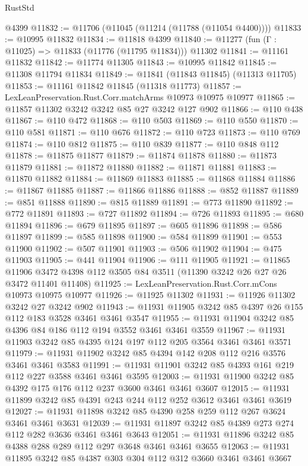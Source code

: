 \begin{lexlean}{RustStd}
\begin{coremodule}
    @4399
@11832 := @11706 (@11045 (@11214 (@11788 (@11054 @4400))))
@11833 := @10995 @11832
@11834 := @11818 @4399
@11840 := @11277 (fun (Γ : @11025) => @11833 (@11776 (@11795 @11834))) @11302
@11841 := @11161 @11832
@11842 := @11774 @11305
@11843 := @10995 @11842
@11845 := @11308 @11794 @11834
@11849 := @11841 (@11843 @11845) (@11313 @11705)
@11853 := @11161 @11842 @11845 (@11318 @11773)
@11857 := LexLeanPreservation.Rust.Corr.matchArms @10973 @10975 @10977
@11865 := @11857 @11302 @3242 @3242 @85 @27 @3242 @127 @902
@11866 := @110 @438
@11867 := @110 @472
@11868 := @110 @503
@11869 := @110 @550
@11870 := @110 @581
@11871 := @110 @676
@11872 := @110 @723
@11873 := @110 @769
@11874 := @110 @812
@11875 := @110 @839
@11877 := @110 @848 @112
@11878 := @11875 @11877
@11879 := @11874 @11878
@11880 := @11873 @11879
@11881 := @11872 @11880
@11882 := @11871 @11881
@11883 := @11870 @11882
@11884 := @11869 @11883
@11885 := @11868 @11884
@11886 := @11867 @11885
@11887 := @11866 @11886
@11888 := @852 @11887
@11889 := @851 @11888
@11890 := @815 @11889
@11891 := @773 @11890
@11892 := @772 @11891
@11893 := @727 @11892
@11894 := @726 @11893
@11895 := @680 @11894
@11896 := @679 @11895
@11897 := @605 @11896
@11898 := @586 @11897
@11899 := @585 @11898
@11900 := @584 @11899
@11901 := @553 @11900
@11902 := @507 @11901
@11903 := @506 @11902
@11904 := @475 @11903
@11905 := @441 @11904
@11906 := @111 @11905
@11921 := @11865
    @11906
    @3472
    @4398
    @112
    @3505
    @84
    @3511
    (@11390 @3242 @26 @27 @26 @3472 @11401 @11408)
@11925 := LexLeanPreservation.Rust.Corr.mCons @10973 @10975 @10977
@11926 := @11925 @11302
@11931 := @11926 @11302 @3242 @27 @3242 @902
@11943 := @11931 @11905 @3242 @85 @4397 @26 @155 @112 @183 @3528 @3461 @3461 @3547
@11955 := @11931 @11904 @3242 @85 @4396 @84 @186 @112 @194 @3552 @3461 @3461 @3559
@11967 := @11931 @11903 @3242 @85 @4395 @124 @197 @112 @205 @3564 @3461 @3461 @3571
@11979 := @11931 @11902 @3242 @85 @4394 @142 @208 @112 @216 @3576 @3461 @3461 @3583
@11991 := @11931 @11901 @3242 @85 @4393 @161 @219 @112 @227 @3588 @3461 @3461 @3595
@12003 := @11931 @11900 @3242 @85 @4392 @175 @176 @112 @237 @3600 @3461 @3461 @3607
@12015 := @11931 @11899 @3242 @85 @4391 @243 @244 @112 @252 @3612 @3461 @3461 @3619
@12027 := @11931 @11898 @3242 @85 @4390 @258 @259 @112 @267 @3624 @3461 @3461 @3631
@12039 := @11931 @11897 @3242 @85 @4389 @273 @274 @112 @282 @3636 @3461 @3461 @3643
@12051 := @11931 @11896 @3242 @85 @4388 @288 @289 @112 @297 @3648 @3461 @3461 @3655
@12063 := @11931 @11895 @3242 @85 @4387 @303 @304 @112 @312 @3660 @3461 @3461 @3667

\end{coremodule}
\end{lexlean}
